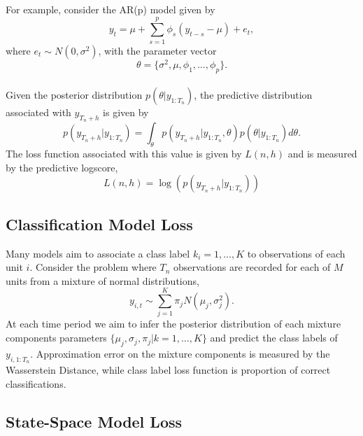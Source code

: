 \documentclass[12pt,a4paper]{article}\usepackage[]{graphicx}\usepackage[]{color}
\begin{document}
For example, consider the AR(p) model given by
\begin{equation}
y_t = \mu + \sum_{s=1}^p \phi_s (y_{t-s} - \mu) + e_t,
\end{equation}
where $e_t \sim N(0, \sigma^2)$, with the parameter vector
\begin{equation}
\theta = \{\sigma^2, \mu, \phi_1, \dots, \phi_p \}.
\end{equation}
\\

Given the posterior distribution $p(\theta | y_{1:T_n})$, the predictive distribution associated with $y_{T_n +h}$ is given by
\begin{equation}
\label{forecastDistIntro}
p(y_{T_n + h} | y_{1:T_n}) = \int_{\theta} p(y_{T_n + h} | y_{1:T_n}, \theta)p(\theta | y_{1:T_n})d\theta.
\end{equation}
The loss function associated with this value is given by $L(n, h)$ and is measured by the predictive logscore,
\begin{equation}
\label{loss:logscoreIntro}
L(n, h) = \log(p(y_{T_n + h} | y_{1:T_n}))
\end{equation}

\subsection{Classification Model Loss}

Many models aim to associate a class label $k_i = 1 , \dots, K$ to observations of each unit $i$. Consider the problem where $T_n$ observations are recorded for each of $M$ units from a mixture of normal distributions,
\begin{equation}
\label{mixNormalDGP}
y_{i, t} \sim \sum_{j=1}^K \pi_{j} N(\mu_j, \sigma^2_{j}).
\end{equation}
At each time period we aim to infer the posterior distribution of each mixture components parameters $\{\mu_j, \sigma_j, \pi_j | k = 1, \dots, K\}$ and predict the class labels of $y_{i, 1:T_n}$. Approximation error on the mixture components is measured by the Wasserstein Distance, while class label loss function is proportion of correct classifications.

\subsection{State-Space Model Loss}
\end{document}
